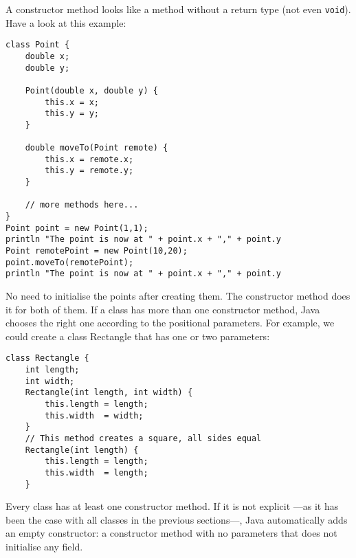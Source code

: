 A constructor method looks like a method without a return type (not
even \verb+void+). Have a look at this example:

\begin{verbatim}
class Point {
    double x;
    double y;
    
    Point(double x, double y) {
        this.x = x;
        this.y = y;
    }
    
    double moveTo(Point remote) {
        this.x = remote.x;
        this.y = remote.y;
    }
    
    // more methods here...
}
Point point = new Point(1,1);
println "The point is now at " + point.x + "," + point.y
Point remotePoint = new Point(10,20);
point.moveTo(remotePoint);
println "The point is now at " + point.x + "," + point.y
\end{verbatim}

No need to initialise the points after creating them. The constructor
method does it for both of them. 
If a class has more than one constructor method, Java chooses the
right one according to the positional parameters. For example, we
could create a class Rectangle that has one or two parameters:

\begin{verbatim}
class Rectangle {
    int length;
    int width;
    Rectangle(int length, int width) {
        this.length = length;
        this.width  = width;
    }
    // This method creates a square, all sides equal
    Rectangle(int length) {
        this.length = length;
        this.width  = length;
    }
\end{verbatim}

Every class has at
least one constructor method. If it is not explicit ---as it has been
the case with all classes in the previous sections---, Java 
automatically adds an empty
constructor: a constructor method with no parameters that does not
initialise any field. 





